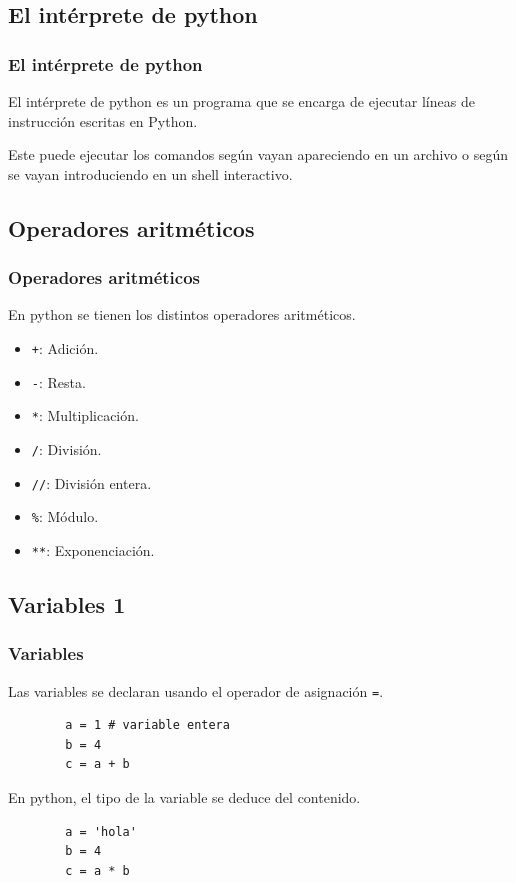 \documentclass[10pt]{beamer}
\begin{document}
\subsection{El intérprete de python}

\begin{frame}
    \frametitle{El intérprete de python}

    El intérprete de python es un programa que se encarga de ejecutar 
    líneas de instrucción escritas en Python. 

    Este puede ejecutar los comandos según vayan apareciendo en un archivo 
    o según se vayan introduciendo en un shell interactivo.
    

\end{frame}

\subsection{Operadores aritméticos}
\begin{frame}
    \frametitle{Operadores aritméticos}
    En python se tienen los distintos operadores aritméticos.
    \begin{itemize}
        \item \texttt{+}: Adición.
        \item \texttt{-}: Resta.
        \item \texttt{*}: Multiplicación.
        \item \texttt{/}: División.
        \item \texttt{//}: División entera.
        \item \texttt{\%}: Módulo.
        \item \texttt{**}: Exponenciación.
    \end{itemize}
\end{frame}
\subsection{Variables 1}
\begin{frame}[fragile]
    \frametitle{Variables}
    Las variables se declaran usando el operador de asignación \texttt{=}.

    \begin{lstlisting}
        a = 1 # variable entera
        b = 4 
        c = a + b
    \end{lstlisting}   
    En python, el tipo de la variable se deduce del contenido.
    \begin{lstlisting}
        a = 'hola'
        b = 4
        c = a * b
    \end{lstlisting} 

\end{frame}
\end{document}
